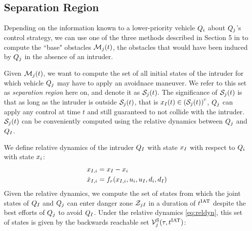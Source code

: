 \subsection{Separation Region} \label{sec:sepRegion}
Depending on the information known to a lower-priority vehicle $Q_i$ about $Q_j$'s control strategy, we can use one of the three methods described in Section 5 in  to compute the ``base" obstacles $\mathcal{M}_j(t)$, the obstacles that would have been induced by $Q_j$ in the absence of an intruder.

Given $\mathcal{M}_j(t)$, we want to compute the set of all initial states of the intruder for which vehicle $Q_j$ may have to apply an avoidnace maneuver. We refer to this set as \textit{separation region} here on, and denote it as $\mathcal{S}_j(t)$. The significance of $\mathcal{S}_j(t)$ is that as long as the intruder is outside $\mathcal{S}_j(t)$, that is $x_{I}(t) \in \left(\mathcal{S}_j(t)\right)^c$, $Q_j$ can apply any control at time $t$ and still guaranteed to not collide with the intruder. $\mathcal{S}_j(t)$ can be conveniently computed using the relative dynamics between $Q_j$ and $Q_{I}$. 

We define relative dynamics of the intruder $Q_{I}$ with state $x_I$ with respect to $Q_i$ with state $x_i$:
\begin{equation}
\label{eq:reldyn}
\begin{aligned}
\state_{\intr, i} &= \state_\intr - \state_i \\
\dot \state_{\intr, i} &= f_r(\state_{\intr, i}, \ctrl_i, \ctrl_\intr, \dstb_i, \dstb_\intr)
\end{aligned}
\end{equation}
Given the relative dynamics, we compute the set of states from which the joint states of $Q_{I}$ and $Q_{j}$ can enter danger zone $\mathcal{Z}_{jI}$ in a duration of $t^\text{IAT}$ despite the best efforts of $Q_j$ to avoid $Q_{I}$. Under the relative dynamics \eqref{eq:reldyn}, this set of states is given by the backwards reachable set $\mathcal{V}^{\text{S}}_j(\tau, t^\text{IAT})$:

